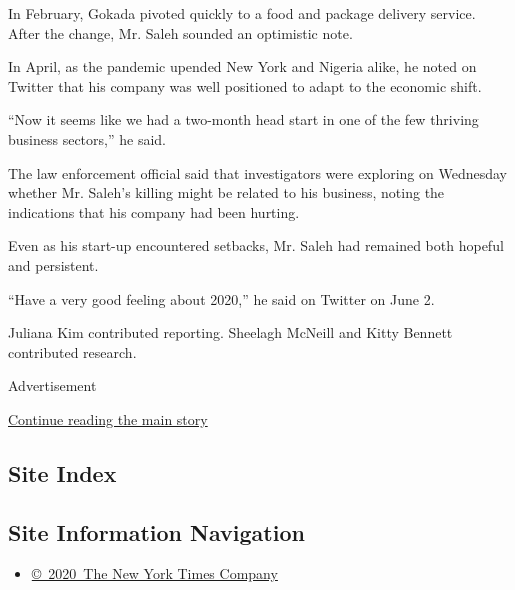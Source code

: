 In February, Gokada pivoted quickly to a food and package delivery
service. After the change, Mr. Saleh sounded an optimistic note.

In April, as the pandemic upended New York and Nigeria alike, he noted
on Twitter that his company was well positioned to adapt to the economic
shift.

``Now it seems like we had a two-month head start in one of the few
thriving business sectors,'' he said.

The law enforcement official said that investigators were exploring on
Wednesday whether Mr. Saleh's killing might be related to his business,
noting the indications that his company had been hurting.

Even as his start-up encountered setbacks, Mr. Saleh had remained both
hopeful and persistent.

``Have a very good feeling about 2020,'' he said on Twitter on June 2.

Juliana Kim contributed reporting. Sheelagh McNeill and Kitty Bennett
contributed research.

Advertisement

\protect\hyperlink{after-bottom}{Continue reading the main story}

\hypertarget{site-index}{%
\subsection{Site Index}\label{site-index}}

\hypertarget{site-information-navigation}{%
\subsection{Site Information
Navigation}\label{site-information-navigation}}

\begin{itemize}
\tightlist
\item
  \href{https://help.nytimes.com/hc/en-us/articles/115014792127-Copyright-notice}{©~2020~The
  New York Times Company}
\end{itemize}

